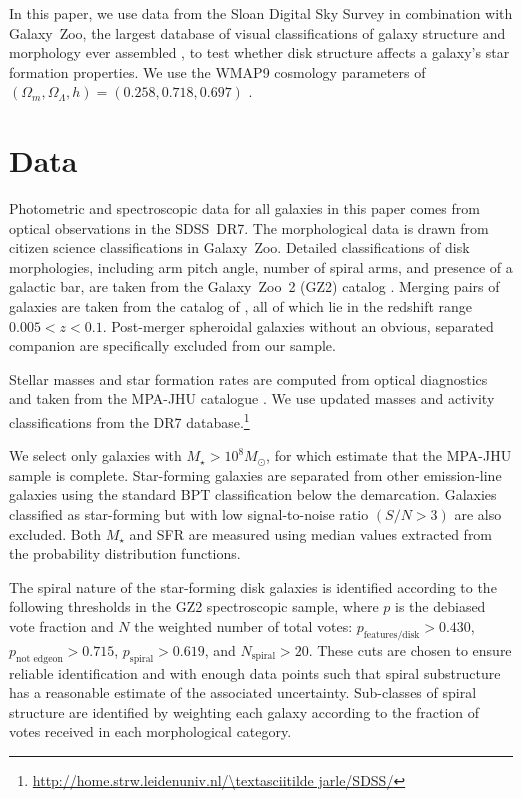 \documentclass[useAMS,usenatbib]{mn2e}
\newcommand{\mytilde}{\textasciitilde}
\def\rr{\color{titlecol}}
\begin{document}
In this paper, we use data from the Sloan Digital Sky Survey \citep[SDSS;][]{yor00,str02,aba09} in combination with Galaxy~Zoo, the largest database of visual classifications of galaxy structure and morphology ever assembled \citep{lin08,lin11,wil13}, to test whether disk structure affects a galaxy's star formation properties. We use the WMAP9 cosmology parameters of $(\Omega_m,\Omega_\Lambda,h)=(0.258,0.718,0.697)$ \citep{hin13}.


\section{Data} \label{sec-data}

Photometric and spectroscopic data for all galaxies in this paper comes from optical observations in the SDSS~DR7. The morphological data is drawn from citizen science classifications in Galaxy~Zoo. Detailed classifications of disk morphologies, including arm pitch angle, number of spiral arms, and presence of a galactic bar, are taken from the Galaxy~Zoo~2 (GZ2) catalog \citep{wil13}. Merging pairs of galaxies are taken from the catalog of \citet{dar10a}, all of which lie in the redshift range $0.005<z<0.1$. Post-merger spheroidal galaxies without an obvious, separated companion are specifically excluded from our sample.

Stellar masses and star formation rates are computed from optical diagnostics and taken from the MPA-JHU catalogue \citep{kau03a,bri04,sal07}. We use updated masses and activity classifications from the DR7 database.\footnote{\url{http://home.strw.leidenuniv.nl/\mytilde jarle/SDSS/}} {\rr We select only galaxies with $M_\star > 10^8 M_\odot$, for which \citet{bri04} estimate that the MPA-JHU sample is complete. Star-forming galaxies are separated from other emission-line galaxies using the standard BPT classification \citep*{bal81} below the \citet{kau03} demarcation. Galaxies classified as star-forming but with low signal-to-noise ratio $(S/N > 3)$ are also excluded. Both $M_\star$ and SFR are measured using median values extracted from the probability distribution functions.

The spiral nature of the star-forming disk galaxies is identified according to the following thresholds in the GZ2 spectroscopic sample, where $p$ is the debiased vote fraction and $N$ the weighted number of total votes: $p_\textrm{features/disk} > 0.430$, $p_\textrm{not~edgeon} > 0.715$, $p_\textrm{spiral}>0.619$, and $N_\textrm{spiral}>20$. These cuts are chosen to ensure reliable identification and with enough data points such that spiral substructure has a reasonable estimate of the associated uncertainty. Sub-classes of spiral structure are identified by weighting each galaxy according to the fraction of votes received in each morphological category. }
\end{document}

